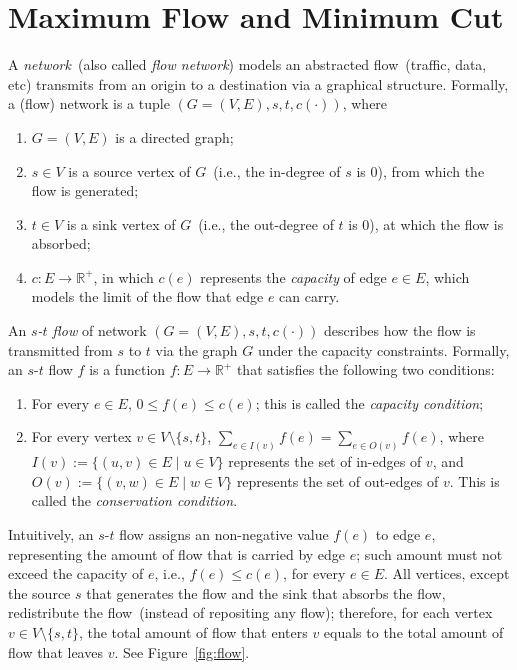\section{Maximum Flow and Minimum Cut}

A \emph{network}~(also called \emph{flow network}) models 
an abstracted flow~(traffic, data, etc) transmits from an origin to a destination
via a graphical structure. Formally, a (flow) network is a tuple $(G = (V, E), s, t, c(\cdot))$, where

\vspace*{-\topsep}
\begin{enumerate}
\item $G = (V, E)$ is a directed graph;
\item $s\in V$ is a source vertex of $G$~(i.e., the in-degree of $s$ is 0), from which the flow is generated;
\item $t\in V$ is a sink vertex of $G$~(i.e., the out-degree of $t$ is 0), at which the flow is absorbed;
\item $c: E\to \mathbb{R}^+$, in which $c(e)$ represents the \emph{capacity} of edge $e\in E$, which models the limit of the flow that edge $e$ can carry.
\end{enumerate}

An \emph{$s$-$t$ flow} of network $(G = (V, E), s, t, c(\cdot))$
describes {how} the flow is transmitted from $s$ to $t$
via the graph $G$ under the capacity constraints. Formally,
an $s$-$t$ flow $f$ is a function $f: E\to \mathbb{R}^+$
that satisfies the following two conditions:
\vspace*{-\topsep}
\begin{enumerate}
\item For every $e\in E$, $0\le f(e) \le c(e)$; this is called the \emph{capacity condition};
\item For every vertex $v\in V\setminus\{s,t\}$, $\sum_{e\in I(v)} f(e) = \sum_{e\in O(v)} f(e)$, where $I(v) := \{(u,v)\in E\mid u\in V\}$ represents
the set of in-edges of $v$, and $O(v) := \{(v,w)\in E\mid w\in V\}$ represents
the set of out-edges of $v$. This is called the \emph{conservation condition}.
\end{enumerate}

Intuitively, an $s$-$t$ flow assigns an non-negative value $f(e)$ to edge $e$, representing the
amount of flow that is carried by edge $e$; such amount must not exceed the capacity of $e$, i.e., $f(e) \le c(e)$, for every $e\in E$.
All vertices, except the source $s$ that generates the flow and the sink that absorbs the flow,
redistribute the flow~(instead of repositing any flow); therefore, for each vertex $v\in V\setminus\{s,t\}$,
the total amount of flow that enters $v$ equals to the total amount of flow that leaves $v$.
See Figure~\ref{fig:flow}.

